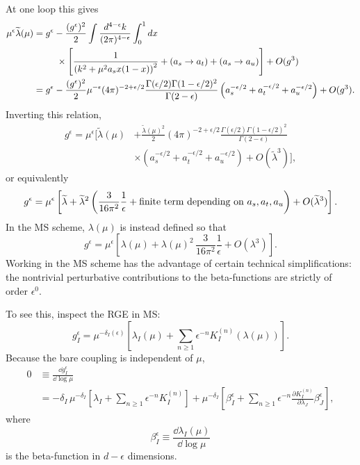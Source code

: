 At one loop this gives
\[
\begin{split}
  \mu^\epsilon\widetilde\lambda(\mu)
  &=
  g^\epsilon
  -
  \frac{(g^\epsilon)^2}{2}
  \int\frac{d^{4-\epsilon}k}{(2\pi)^{4-\epsilon}}
  \int_0^1 dx
\\
  &\hspace{2.5em}\times
  \left[
    \frac{1}{\left(k^2+\mu^2 a_s x(1-x)\right)^2}
    +(a_s\to a_t)+(a_s\to a_u)
  \right]
  +O(g^3)
\\
  &=
  g^\epsilon
  -
  \frac{(g^\epsilon)^2}{2}
  \mu^{-\epsilon}
  (4\pi)^{-2+\epsilon/2}
  \frac{
    \Gamma(\epsilon/2)\Gamma(1-\epsilon/2)^2
  }{
    \Gamma(2-\epsilon)
  }
  \left(a_s^{-\epsilon/2}+a_t^{-\epsilon/2}+a_u^{-\epsilon/2}\right)
  +O(g^3).
\end{split}
\]
Inverting this relation,
\[
\begin{split}
  g^\epsilon
  =
  \mu^\epsilon
  \bigg[
    \widetilde\lambda(\mu)
    &+
    \frac{\widetilde\lambda(\mu)^2}{2}
    (4\pi)^{-2+\epsilon/2}
    \frac{\Gamma(\epsilon/2)\Gamma(1-\epsilon/2)^2}
         {\Gamma(2-\epsilon)}
\\
    &\times
    \left(a_s^{-\epsilon/2}+a_t^{-\epsilon/2}+a_u^{-\epsilon/2}\right)
    +O(\widetilde\lambda^3)
  \bigg],
\end{split}
\]
or equivalently
\[
  g^\epsilon
  =
  \mu^\epsilon
  \left[
    \widetilde\lambda
    +
    \widetilde\lambda^2
    \left(
      \frac{3}{16\pi^2}\frac{1}{\epsilon}
      +\hbox{finite term depending on }a_s,a_t,a_u
    \right)
    +O(\widetilde\lambda^3)
  \right].
\]
In the MS scheme, \(\lambda(\mu)\) is instead defined so that
\[
  g^\epsilon
  =
  \mu^\epsilon
  \left[
    \lambda(\mu)
    +
    \lambda(\mu)^2\,
    \frac{3}{16\pi^2}\frac{1}{\epsilon}
    +O(\lambda^3)
  \right].
\]
Working in the MS scheme has the advantage of certain technical
simplifications: the nontrivial perturbative contributions to the
beta-functions are strictly of order \(\epsilon^0\).

To see this, inspect the RGE in MS:
\[
  g_I^\epsilon
  =
  \mu^{-\delta_I(\epsilon)}
  \left[
    \lambda_I(\mu)
    +
    \sum_{n\geq1}
    \epsilon^{-n}K_I^{(n)}(\lambda(\mu))
  \right].
\]
Because the bare coupling is independent of \(\mu\),
\[
\begin{split}
  0
  &\equiv
  \frac{\dd g_I^\epsilon}{\dd\log\mu}
\\
  &=
  -\delta_I\,\mu^{-\delta_I}
  \left[
    \lambda_I+\sum_{n\geq1}\epsilon^{-n}K_I^{(n)}
  \right]
  +
  \mu^{-\delta_I}
  \left[
    \beta_I^\epsilon
    +
    \sum_{n\geq1}
    \epsilon^{-n}
    \frac{\partial K_I^{(n)}}{\partial \lambda_J}
    \beta_J^\epsilon
  \right],
\end{split}
\]
where
\[
  \beta_I^\epsilon\equiv
  \frac{\dd\lambda_I(\mu)}{\dd\log\mu}
\]
is the beta-function in \(d-\epsilon\) dimensions.

